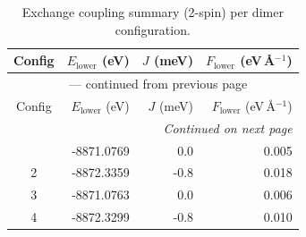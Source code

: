 
\begin{longtable}{@{}crrr@{}}
\caption{Exchange coupling summary (2-spin) per dimer configuration.}
\label{tab:exchange_couplings_2spin}\\
\toprule
Config & $E_{\mathrm{lower}}$ (eV) & $J$ (meV) & $F_{\mathrm{lower}}$ (eV\,\AA$^{-1}$)\\
\midrule
\endfirsthead
\multicolumn{4}{c}{{\tablename}~\thetable{} --- continued from previous page}\\
\toprule
Config & $E_{\mathrm{lower}}$ (eV) & $J$ (meV) & $F_{\mathrm{lower}}$ (eV\,\AA$^{-1}$)\\
\midrule
\endhead
\midrule
\multicolumn{4}{r}{\emph{Continued on next page}}\\
\endfoot
\bottomrule
\endlastfoot
1 & -8871.0769 & \textcolor{red!20}{0.0} & 0.005 \\
2 & -8872.3359 & \textcolor{blue!93}{-0.8} & 0.018 \\
3 & -8871.0763 & \textcolor{red!20}{0.0} & 0.006 \\
4 & -8872.3299 & \textcolor{blue!100}{-0.8} & 0.010 \\
\end{longtable}